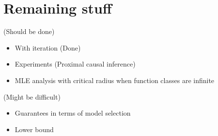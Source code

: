\documentclass[14pt]{extarticle} %
\begin{document}
\section{Remaining stuff}

(Should be done) 
\begin{itemize}
    \item With iteration (Done)
    \item Experiments (Proximal causal inference) 
    \item MLE analysis with critical radius when function classes are infinite  
\end{itemize}

(Might be difficult)
\begin{itemize}
    \item Guarantees in terms of model selection 
    \item Lower bound 
\end{itemize}



\end{document}

